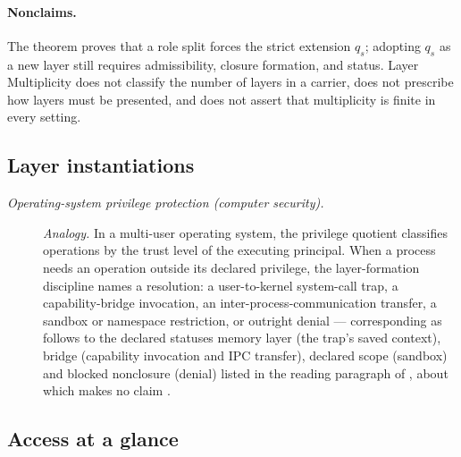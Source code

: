 \paragraph{Nonclaims.} The theorem proves that a role split forces
the strict extension \(q_s\); adopting \(q_s\) as a new layer still
requires admissibility, closure formation, and status.
Layer Multiplicity does not classify the number of layers in a
carrier, does not prescribe how layers must be presented, and does
not assert that multiplicity is finite in every setting.

\subsection*{Layer instantiations}\label{layer-inst:F24}

\begingroup\small
\begin{description}
\item[\emph{Operating-system privilege protection (computer
security).}] \textit{Analogy.}
In a multi-user operating system, the privilege quotient classifies
operations by the trust level of the executing principal.  When a
process needs an operation outside its declared privilege, the
layer-formation discipline names a resolution: a user-to-kernel
system-call trap, a capability-bridge invocation, an
inter-process-communication transfer, a sandbox or namespace
restriction, or
outright denial --- corresponding as follows to the declared statuses memory layer (the trap's
saved context), bridge (capability invocation and IPC transfer), declared scope
(sandbox) and blocked nonclosure (denial) listed in the reading paragraph of
, about which  makes no claim
\citep{SaltzerSchroeder1975ProtectionInformation}.

\end{description}
\endgroup


\subsection*{Access at a glance}\label{sec:access:summary}

\FloatBarrier
